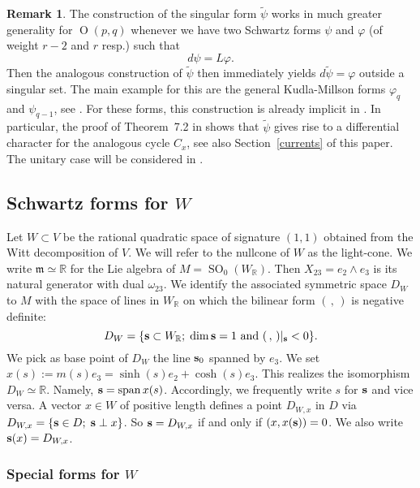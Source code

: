 \documentclass[12pt,leqno]{amsart}
\numberwithin{equation}{section}
\theoremstyle{plain}
\theoremstyle{definition}
\newtheorem{remark}[theorem]{Remark}
\theoremstyle{remark}
\newcommand{\R}{\mathbb{R}}
\newcommand{\Span}{\operatorname{span}}
\newcommand{\Orth}{\operatorname{O}}
\newcommand{\SO}{\operatorname{SO}}
\begin{document}
\begin{remark}
The construction of the singular form $\tilde{\psi}$ works in much greater generality for $\Orth(p,q)$ whenever we have two Schwartz forms $\psi$ and $\varphi$ (of weight $r-2$ and $r$ resp.) such that 
\[
d \psi = L \varphi.
\]
Then the analogous construction of $\tilde{\psi}$ then immediately yields $d \tilde{\psi} = \varphi$ outside a singular set. The main example for this are the general Kudla-Millson forms $\varphi_{q}$ and $\psi_{q-1}$, see \cite{KM90}. For these forms, this construction is already implicit in \cite{BFDuke}. In particular, the proof of Theorem~7.2 in \cite{BFDuke} shows that $\tilde{\psi}$ gives rise to a differential character for the analogous cycle $C_x$, see also Section~\ref{currents} of this paper. The unitary case will be considered in \cite{F-unitary}. 
\end{remark}




\subsection{Schwartz forms for $W$}




Let $W\subset V$ be the rational quadratic space of signature $(1,1)$ obtained from the Witt decomposition of $V$. We will refer to the nullcone of $W$ as the light-cone. We write $\mathfrak{m} \simeq \R$ for the Lie algebra of $M = \SO_0(W_{\R})$. 
Then $X_{23} = e_2 \wedge e_3$ is its natural generator with dual $\omega_{23}$.
We identify the associated symmetric space $D_W$ to $M$ with the
space of lines in $W_{\R}$ on which the bilinear form $(\,,\,)$ is
negative definite:
\[
D_W = \{{\bf s} \subset W_{\R} ; \;\text{$\dim {\bf s} =1$ and $(\,,\,)|_{\bf s} < 0$}
\}.
\]
We pick as base point of $D_W$ the line ${\bf s}_0$ spanned by $e_3$. We set $
x(s) := m(s) e_3 = \sinh(s) e_2 + \cosh(s) e_3$. This realizes the isomorphism $D_W \simeq \R$. Namely, ${\bf s} = \Span x(s)$. Accordingly, we frequently write $s$ for ${\bf s}$ and vice versa. A vector $x \in W$ of positive length defines a point $D_{W,x}$ in
$D$ via $D_{W,x} = \{ {\bf s} \in D; \; {\bf s} \perp x \}$. So ${\bf s} = D_{W,x}$ if and only if $(x,x({\bf s})) =0$. We also write ${\bf s}(x)=D_{W,x}$.

\subsubsection{Special forms for $W$}\label{W-forms}
\end{document}
